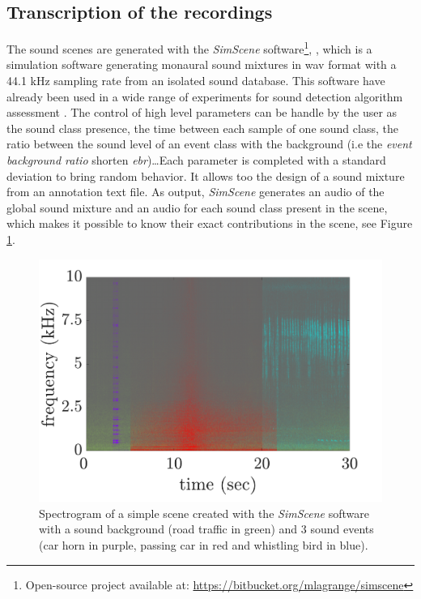 \documentclass[review,5p,twocolumn,sort&compress,times]{elsarticle}
\begin{document}
\subsection{Transcription of the recordings}\label{part:simScene}
The sound scenes are generated with the \textit{SimScene} software\footnote{Open-source project available at: \url{https://bitbucket.org/mlagrange/simscene}}, \cite{rossignol_simscene:_2015}, which is a simulation software generating monaural sound mixtures in wav format with a 44.1 kHz sampling rate from an isolated sound database. 
This software have already been used in a wide range of experiments for sound detection algorithm assessment \cite{lafay_new_2014, benetos2016detection}. The control of high level parameters can be handle by the user as the sound class presence, the time between each sample of one sound class, the ratio between the sound level of an event class with the background (i.e the \textit{event background ratio} shorten \textit{ebr})\dots Each parameter is completed with a standard deviation to bring random behavior. It allows too the design of a sound mixture from an annotation text file. 
As output, \textit{SimScene} generates an audio of the global sound mixture and an audio for each sound class present in the scene, which makes it possible to know their exact contributions in the scene, see Figure \ref{fig:example_simScene}. 

\begin{figure}[t]
    \centering
       \includegraphics[width=.8\linewidth]{./figures/exampleSimScene.pdf}
    \caption{Spectrogram of a simple scene created with the \textit{SimScene} software with a sound background (road traffic in green) and 3 sound events (car horn in purple, passing car in red and whistling bird in blue).} 
    \label{fig:example_simScene}
\end{figure}
\end{document}
